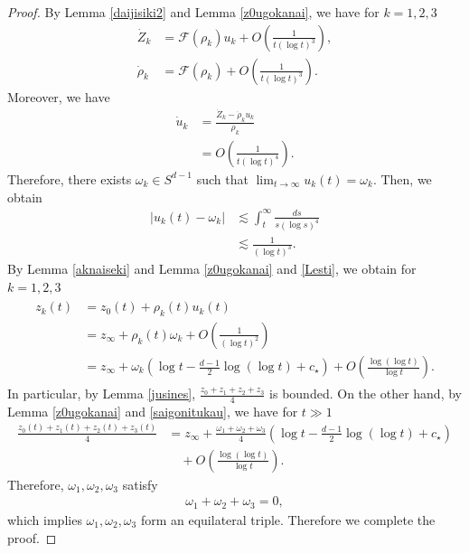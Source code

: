 \documentclass[reqno]{amsart}
\theoremstyle{plain}
\theoremstyle{definition}
\numberwithin{equation}{section}
\newcommand{\1}{\mathbbm{1}}
\begin{document}
\begin{proof}
By Lemma \ref{daijisiki2} and Lemma \ref{z0ugokanai}, we have for $k=1,2,3$
\begin{align*}
\dot{Z}_k&=\mathcal{F}(\rho_k)u_k+O\left(\frac{1}{t(\log{t})^3}\right),
\\
\dot{\rho}_k&=\mathcal{F}(\rho_k)+O\left(\frac{1}{t(\log{t})^3}\right).
\end{align*}
Moreover, we have
\begin{align*}
\dot{u}_k&=\frac{\dot{Z}_k-\dot{\rho}_ku_k}{\rho_k}
\\
&=O\left(\frac{1}{t(\log{t})^4}\right).
\end{align*}
Therefore, there exists $\omega_k\in S^{d-1}$ such that $\lim_{t\to\infty}u_k(t)=\omega_k$. Then, we obtain
\begin{align*}
\left|u_k(t)-\omega_k\right|&\lesssim \int_t^{\infty} \frac{ds}{s(\log{s})^4}
\\
&\lesssim \frac{1}{(\log{t})^3}.
\end{align*}
By Lemma \ref{aknaiseki} and Lemma \ref{z0ugokanai} and \eqref{Lesti}, we obtain for $k=1,2,3$
\begin{align}\label{saigonitukau}
\begin{aligned}
z_k(t)&=z_0(t)+\rho_k(t)u_k(t)
\\
&=z_{\infty}+\rho_k(t)\omega_k+O\left(\frac{1}{(\log{t})^2}\right)
\\
&=z_{\infty}+\omega_k\left(\log{t}-\frac{d-1}{2}\log{(\log{t})}+c_{\star}\right)+O\left(\frac{\log{(\log{t})}}{\log{t}}\right).
\end{aligned}
\end{align}
In particular, by Lemma \ref{jusines}, $\frac{z_0+z_1+z_2+z_3}{4}$ is bounded. On the other hand, by Lemma \ref{z0ugokanai} and \eqref{saigonitukau}, we have for $t\gg 1$
\begin{align*}
\frac{z_0(t)+z_1(t)+z_2(t)+z_3(t)}{4}&=z_{\infty}+\frac{\omega_1+\omega_2+\omega_3}{4}\left(\log{t}-\frac{d-1}{2}\log{(\log{t})}+c_{\star}\right)
\\
&\quad+O\left(\frac{\log{(\log{t})}}{\log{t}}\right).
\end{align*}
Therefore, $\omega_1,\omega_2,\omega_3$ satisfy
\begin{align*}
\omega_1+\omega_2+\omega_3=0,
\end{align*}
which implies $\omega_1,\omega_2,\omega_3$ form an equilateral triple. Therefore we complete the proof.

\end{proof}
\end{document}
